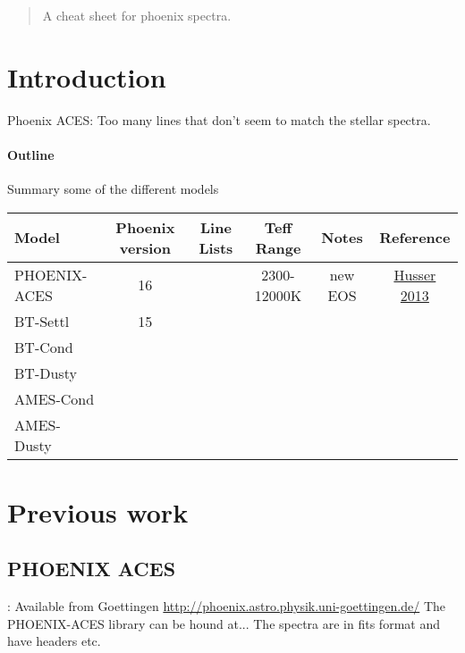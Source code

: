 \documentclass[12pt, a4paper]{article}
\begin{document}
\maketitle

\begin{abstract}
A cheat sheet for phoenix spectra.
\end{abstract}

\section{Introduction}
Phoenix ACES:
Too many lines that don't seem to match the stellar spectra.


\paragraph{Outline}

Summary some of the different models

\begin{table}
	\begin{tabular}{lccccc}
		\hline
		Model & Phoenix version & Line Lists & Teff Range &  Notes &Reference\\
		\hline
		PHOENIX-ACES & 16 & & 2300-12000K & new EOS & \href{https://arxiv.org/abs/1303.5632}{Husser 2013} \\
		
	BT-Settl & 15 & & & & \href{}{} \\
	BT-Cond & & & & & \href{}{} \\
	BT-Dusty & & & & & \href{}{} \\
	AMES-Cond & & & & & \href{}{} \\
    AMES-Dusty & & & & & \href{}{} \\
    \hline
	\end{tabular}
\end{table}


\section{Previous work}\label{previous work}


\subsection{PHOENIX ACES}:
Available from Goettingen  \href{http://phoenix.astro.physik.uni-goettingen.de/}{http://phoenix.astro.physik.uni-goettingen.de/}
The PHOENIX-ACES library can be hound at...
The spectra are in fits format and have headers etc. 
\end{document}
